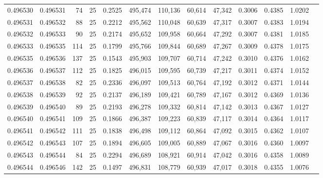 \begin{tabular}{rrrrrrrrrrrrr}
0.496530 & 0.496531 &    74 &  25 &                                     0.2525 & 495,474 & 110,136 &  60,614 &  47,342 & 0.3006 & 0.4385 & 1.0202 \\
0.496531 & 0.496532 &    88 &  25 &                                     0.2212 & 495,562 & 110,048 &  60,639 &  47,317 & 0.3007 & 0.4383 & 1.0194 \\
0.496532 & 0.496533 &    90 &  25 &                                     0.2174 & 495,652 & 109,958 &  60,664 &  47,292 & 0.3007 & 0.4381 & 1.0185 \\
0.496533 & 0.496535 &   114 &  25 &                                     0.1799 & 495,766 & 109,844 &  60,689 &  47,267 & 0.3009 & 0.4378 & 1.0175 \\
0.496535 & 0.496536 &   137 &  25 &                                     0.1543 & 495,903 & 109,707 &  60,714 &  47,242 & 0.3010 & 0.4376 & 1.0162 \\
0.496536 & 0.496537 &   112 &  25 &                                     0.1825 & 496,015 & 109,595 &  60,739 &  47,217 & 0.3011 & 0.4374 & 1.0152 \\
0.496537 & 0.496538 &    82 &  25 &                                     0.2336 & 496,097 & 109,513 &  60,764 &  47,192 & 0.3012 & 0.4371 & 1.0144 \\
0.496538 & 0.496539 &    92 &  25 &                                     0.2137 & 496,189 & 109,421 &  60,789 &  47,167 & 0.3012 & 0.4369 & 1.0136 \\
0.496539 & 0.496540 &    89 &  25 &                                     0.2193 & 496,278 & 109,332 &  60,814 &  47,142 & 0.3013 & 0.4367 & 1.0127 \\
0.496540 & 0.496541 &   109 &  25 &                                     0.1866 & 496,387 & 109,223 &  60,839 &  47,117 & 0.3014 & 0.4364 & 1.0117 \\
0.496541 & 0.496542 &   111 &  25 &                                     0.1838 & 496,498 & 109,112 &  60,864 &  47,092 & 0.3015 & 0.4362 & 1.0107 \\
0.496542 & 0.496543 &   107 &  25 &                                     0.1894 & 496,605 & 109,005 &  60,889 &  47,067 & 0.3016 & 0.4360 & 1.0097 \\
0.496543 & 0.496544 &    84 &  25 &                                     0.2294 & 496,689 & 108,921 &  60,914 &  47,042 & 0.3016 & 0.4358 & 1.0089 \\
0.496544 & 0.496546 &   142 &  25 &                                     0.1497 & 496,831 & 108,779 &  60,939 &  47,017 & 0.3018 & 0.4355 & 1.0076 \\

\end{tabular}
